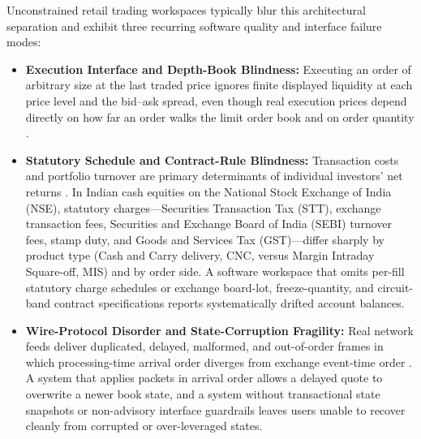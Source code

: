 \documentclass[12pt]{article}
\begin{document}
Unconstrained retail trading workspaces typically blur this architectural separation and exhibit three recurring software quality and interface failure modes:
\begin{itemize}
  \item \textbf{Execution Interface and Depth-Book Blindness:} Executing an order of arbitrary size at the last traded price ignores finite displayed liquidity at each price level and the bid--ask spread, even though real execution prices depend directly on how far an order walks the limit order book and on order quantity \cite{almgren2001,kyle1985,glosten1985,cont2010}.
  \item \textbf{Statutory Schedule and Contract-Rule Blindness:} Transaction costs and portfolio turnover are primary determinants of individual investors' net returns \cite{barber2000,barber2002,barber2009}. In Indian cash equities on the National Stock Exchange of India (NSE), statutory charges—Securities Transaction Tax (STT), exchange transaction fees, Securities and Exchange Board of India (SEBI) turnover fees, stamp duty, and Goods and Services Tax (GST)—differ sharply by product type (Cash and Carry delivery, CNC, versus Margin Intraday Square-off, MIS) and by order side. A software workspace that omits per-fill statutory charge schedules or exchange board-lot, freeze-quantity, and circuit-band contract specifications reports systematically drifted account balances.
  \item \textbf{Wire-Protocol Disorder and State-Corruption Fragility:} Real network feeds deliver duplicated, delayed, malformed, and out-of-order frames in which processing-time arrival order diverges from exchange event-time order \cite{akidau2015,lamport1978,hasbrouck2013}. A system that applies packets in arrival order allows a delayed quote to overwrite a newer book state, and a system without transactional state snapshots or non-advisory interface guardrails leaves users unable to recover cleanly from corrupted or over-leveraged states.
\end{itemize}
\end{document}
